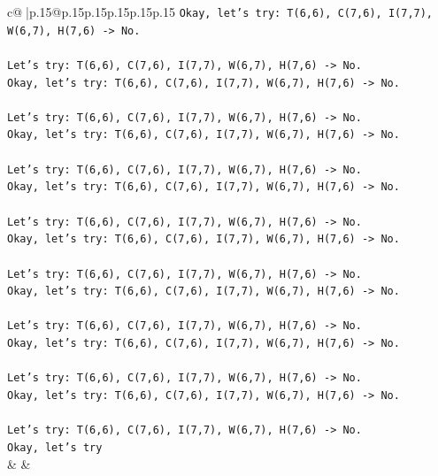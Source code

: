 \documentclass{article}
\begin{document}
{\begin{supertabular}{c@{$\;$}|p{.15\linewidth}@{}p{.15\linewidth}p{.15\linewidth}p{.15\linewidth}p{.15\linewidth}p{.15\linewidth}}
{{{\texttt{Okay, let's try: T(6,6), C(7,6), I(7,7), W(6,7), H(7,6) {-}> No.} \\
\\ 
\texttt{Let's try: T(6,6), C(7,6), I(7,7), W(6,7), H(7,6) {-}> No.} \\
\texttt{Okay, let's try: T(6,6), C(7,6), I(7,7), W(6,7), H(7,6) {-}> No.} \\
\\ 
\texttt{Let's try: T(6,6), C(7,6), I(7,7), W(6,7), H(7,6) {-}> No.} \\
\texttt{Okay, let's try: T(6,6), C(7,6), I(7,7), W(6,7), H(7,6) {-}> No.} \\
\\ 
\texttt{Let's try: T(6,6), C(7,6), I(7,7), W(6,7), H(7,6) {-}> No.} \\
\texttt{Okay, let's try: T(6,6), C(7,6), I(7,7), W(6,7), H(7,6) {-}> No.} \\
\\ 
\texttt{Let's try: T(6,6), C(7,6), I(7,7), W(6,7), H(7,6) {-}> No.} \\
\texttt{Okay, let's try: T(6,6), C(7,6), I(7,7), W(6,7), H(7,6) {-}> No.} \\
\\ 
\texttt{Let's try: T(6,6), C(7,6), I(7,7), W(6,7), H(7,6) {-}> No.} \\
\texttt{Okay, let's try: T(6,6), C(7,6), I(7,7), W(6,7), H(7,6) {-}> No.} \\
\\ 
\texttt{Let's try: T(6,6), C(7,6), I(7,7), W(6,7), H(7,6) {-}> No.} \\
\texttt{Okay, let's try: T(6,6), C(7,6), I(7,7), W(6,7), H(7,6) {-}> No.} \\
\\ 
\texttt{Let's try: T(6,6), C(7,6), I(7,7), W(6,7), H(7,6) {-}> No.} \\
\texttt{Okay, let's try: T(6,6), C(7,6), I(7,7), W(6,7), H(7,6) {-}> No.} \\
\\ 
\texttt{Let's try: T(6,6), C(7,6), I(7,7), W(6,7), H(7,6) {-}> No.} \\
\texttt{Okay, let's try} \\
            }
        }
    }
    & & \\ \\


\end{supertabular}}
\end{document}
